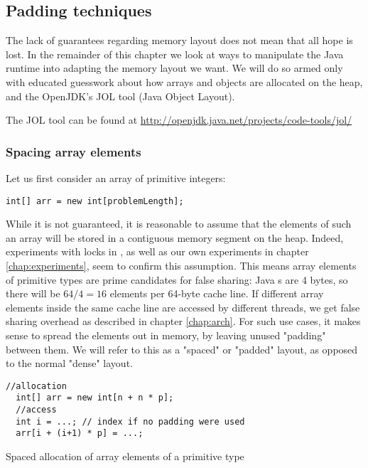 \subsection{Padding techniques}
The lack of guarantees regarding memory layout does not mean that all hope is
lost. In the remainder of this chapter we look at ways to manipulate the Java
runtime into adapting the memory layout we want. We will do so armed only with
educated guesswork about how arrays and objects are allocated on the heap, and
the OpenJDK's JOL tool (Java Object Layout).

The JOL tool can be found at
\url{http://openjdk.java.net/projects/code-tools/jol/}

\subsubsection{Spacing array elements}

Let us first consider an array of primitive integers:

\begin{code}[h]
\begin{Verbatim}[frame=single]
  int[] arr = new int[problemLength];
\end{Verbatim}
	\caption{}
\end{code}

While it is not guaranteed, it is reasonable to assume that the elements of such
an array will be stored in a contiguous memory segment on the heap. Indeed,
experiments with locks in \cite{mystery}, as well as our own experiments in
chapter \ref{chap:experiments}, seem to confirm this assumption. This means
array elements of primitive types are prime candidates for false sharing:
Java s are 4 bytes, so there will be $64/4 = 16$ elements per
64-byte cache line. If different array elements inside the same cache line are
accessed by different threads, we get false sharing overhead as described in
chapter \ref{chap:arch}. For such use cases, it makes sense to spread the
elements out in memory, by leaving unused "padding" between them. We will refer
to this as a "spaced" or "padded" layout, as opposed to the normal "dense"
layout.

\begin{padding}[h]
\begin{Verbatim}[frame=single]
  //allocation
  int[] arr = new int[n + n * p];
  //access
  int i = ...; // index if no padding were used
  arr[i + (i+1) * p] = ...;
\end{Verbatim}
	\caption{Spaced allocation of array elements of a primitive type}
	\label{padding:primitive-array}
\end{padding}

